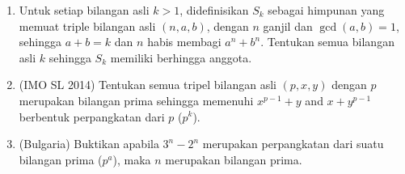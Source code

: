 \documentclass[12pt]{scrartcl}
\begin{document}
\begin{enumerate}[resume]
    \item Untuk setiap bilangan asli $k>1$, didefinisikan $S_k$ sebagai himpunan yang memuat triple bilangan asli $(n,a,b)$, dengan $n$ ganjil dan $\gcd (a,b)=1$, sehingga $a+b=k$ dan $n$ habis membagi $a^n+b^n$. Tentukan semua bilangan asli $k$ sehingga $S_k$ memiliki berhingga anggota.

    \item (IMO SL 2014) Tentukan semua tripel bilangan asli $(p, x, y)$ dengan $p$ merupakan bilangan prima sehingga memenuhi $x^{p -1} + y$ and $x + y^ {p -1}$ berbentuk perpangkatan dari $p$ ($p^k$). 

    \item (Bulgaria) Buktikan apabila $3^n-2^n$ merupakan perpangkatan dari suatu bilangan prima ($p^a$), maka $n$ merupakan bilangan prima.
\end{enumerate}
\end{document}
